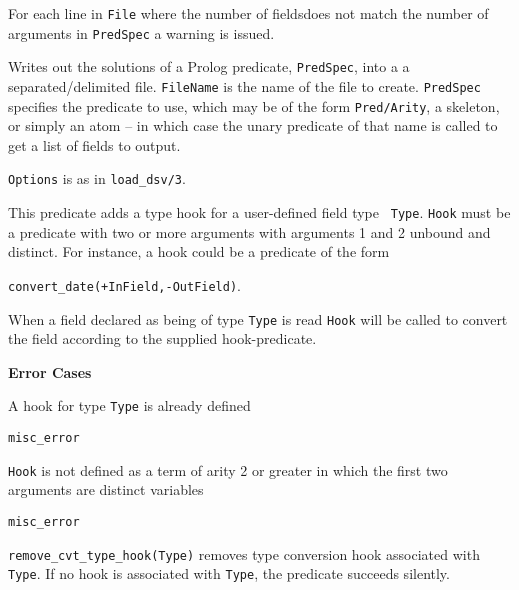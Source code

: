 \begin{description}
For each line in {\tt File} where the number of fieldsdoes not match
the number of arguments in {\tt PredSpec} a warning is issued.

Writes out the solutions of a Prolog predicate, {\tt PredSpec}, into a
a separated/delimited file.  {\tt FileName} is the name of the file to
create.  {\tt PredSpec} specifies the predicate to use, which may be
of the form {\tt Pred/Arity}, a skeleton, or simply an atom -- in
which case the unary predicate of that name is called to get a list of
fields to output.

{\tt Options} is as in {\tt load\_dsv/3}.




%
This predicate adds a type hook for a user-defined field type {\tt
  Type}.  {\tt Hook} must be a predicate with two or more arguments
with arguments 1 and 2 unbound and distinct. For instance, a hook
could be a predicate of the form

{\tt convert\_date(+InField,-OutField)}.

When a field declared as being of type {\tt Type} is read {\tt Hook}
will be called to convert the field according to the supplied
hook-predicate.

{\bf Error Cases} 
\bi
\item 	A hook for type {\tt Type} is already defined
\bi
\item    {\tt misc\_error}
\ei
\item {\tt Hook} is not defined as a term of arity 2 or greater in which the first two arguments are distinct variables \bi
\item    {\tt misc\_error}
  \ei
  \ei
  
%
{\tt remove\_cvt\_type\_hook(Type)} removes type conversion hook
associated with {\tt Type}.  If no hook is associated with {\tt Type},
the predicate succeeds silently.


\end{description}
